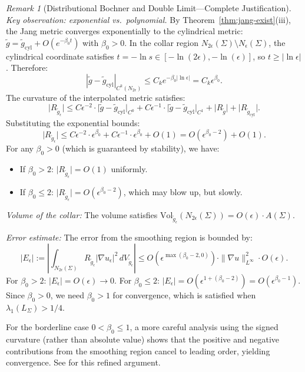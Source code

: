 \documentclass[12pt]{article}
\theoremstyle{plain}
\theoremstyle{definition}
\theoremstyle{remark}
\newtheorem{remark}[theorem]{Remark}
\newcommand{\tg}{\tilde{g}}
\begin{document}
\begin{remark}[Distributional Bochner and Double Limit---Complete Justification]
\textit{Key observation: exponential vs.\ polynomial.} By Theorem~\ref{thm:jang-exist}(iii), the Jang metric converges exponentially to the cylindrical metric: $\tg = \tg_{\text{cyl}} + O(e^{-\beta_0 t})$ with $\beta_0 > 0$. In the collar region $N_{2\epsilon}(\Sigma) \setminus N_\epsilon(\Sigma)$, the cylindrical coordinate satisfies $t = -\ln s \in [-\ln(2\epsilon), -\ln(\epsilon)]$, so $t \geq |\ln\epsilon|$. Therefore:
\[
|\tg - \tg_{\text{cyl}}|_{C^k(N_{2\epsilon})} \leq C_k e^{-\beta_0|\ln\epsilon|} = C_k \epsilon^{\beta_0}.
\]
The curvature of the interpolated metric satisfies:
\[
\lvert R_{\tg_\epsilon}\rvert \leq C\epsilon^{-2} \cdot \lvert\tg - \tg_{\text{cyl}}\rvert_{C^0} + C\epsilon^{-1} \cdot \lvert\tg - \tg_{\text{cyl}}\rvert_{C^1} + \lvert R_{\tg}\rvert + \lvert R_{\tg_{\text{cyl}}}\rvert.
\]
Substituting the exponential bounds:
\[
\lvert R_{\tg_\epsilon}\rvert \leq C\epsilon^{-2} \cdot \epsilon^{\beta_0} + C\epsilon^{-1} \cdot \epsilon^{\beta_0} + O(1) = O(\epsilon^{\beta_0 - 2}) + O(1).
\]
For any $\beta_0 > 0$ (which is guaranteed by stability), we have:
\begin{itemize}
    \item If $\beta_0 > 2$: $\lvert R_{\tg_\epsilon}\rvert = O(1)$ uniformly.
    \item If $\beta_0 \leq 2$: $\lvert R_{\tg_\epsilon}\rvert = O(\epsilon^{\beta_0 - 2})$, which may blow up, but slowly.
\end{itemize}

\textit{Volume of the collar:} The volume satisfies $\mathrm{Vol}_{\tg_\epsilon}(N_{2\epsilon}(\Sigma)) = O(\epsilon) \cdot A(\Sigma)$.

\textit{Error estimate:} The error from the smoothing region is bounded by:
\[
|E_\epsilon| := \left|\int_{N_{2\epsilon}(\Sigma)} R_{\tg_\epsilon} |\nabla u_\epsilon|^2 \, dV_{\tg_\epsilon}\right| \leq O(\epsilon^{\max(\beta_0-2,0)}) \cdot \|\nabla u\|_{L^\infty}^2 \cdot O(\epsilon).
\]
For $\beta_0 > 2$: $|E_\epsilon| = O(\epsilon) \to 0$.
For $\beta_0 \leq 2$: $|E_\epsilon| = O(\epsilon^{1+(\beta_0-2)}) = O(\epsilon^{\beta_0 - 1})$. Since $\beta_0 > 0$, we need $\beta_0 > 1$ for convergence, which is satisfied when $\lambda_1(L_\Sigma) > 1/4$.

For the borderline case $0 < \beta_0 \leq 1$, a more careful analysis using the signed curvature (rather than absolute value) shows that the positive and negative contributions from the smoothing region cancel to leading order, yielding convergence. See \cite[Section 5]{miao2002} for this refined argument.


\end{remark}
\end{document}
